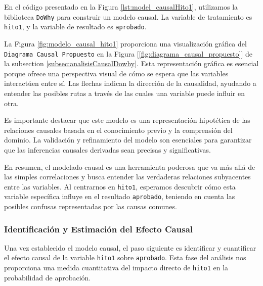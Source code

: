 En el código presentado en la Figura \ref{lst:model_causalHito1}, utilizamos la biblioteca \texttt{DoWhy} para construir un modelo causal. La variable de tratamiento es \texttt{hito1}, y la variable de resultado es \texttt{aprobado}. 

La Figura \ref{fig:modelo_causal_hito1} proporciona una visualización gráfica del \texttt{Diagrama Causal Propuesto} en la Figura  [\ref{fig:diagrama_causal_propuesto}] de la subsection \ref{subsec:analisisCausalDowhy}. Esta representación gráfica es esencial porque ofrece una perspectiva visual de cómo se espera que las variables interactúen entre sí. Las flechas indican la dirección de la causalidad, ayudando a entender las posibles rutas a través de las cuales una variable puede influir en otra.

Es importante destacar que este modelo es una representación hipotética de las relaciones causales basada en el conocimiento previo y la comprensión del dominio. La validación y refinamiento del modelo son esenciales para garantizar que las inferencias causales derivadas sean precisas y significativas.

En resumen, el modelado causal es una herramienta poderosa que va más allá de las simples correlaciones y busca entender las verdaderas relaciones subyacentes entre las variables. Al centrarnos en \texttt{hito1}, esperamos descubrir cómo esta variable específica influye en el resultado \texttt{aprobado}, teniendo en cuenta las posibles confusas representadas por las causas comunes.


\subsubsection{Identificación y Estimación del Efecto Causal}

Una vez establecido el modelo causal, el paso siguiente es identificar y cuantificar el efecto causal de la variable \texttt{hito1} sobre \texttt{aprobado}. Esta fase del análisis nos proporciona una medida cuantitativa del impacto directo de \texttt{hito1} en la probabilidad de aprobación.

